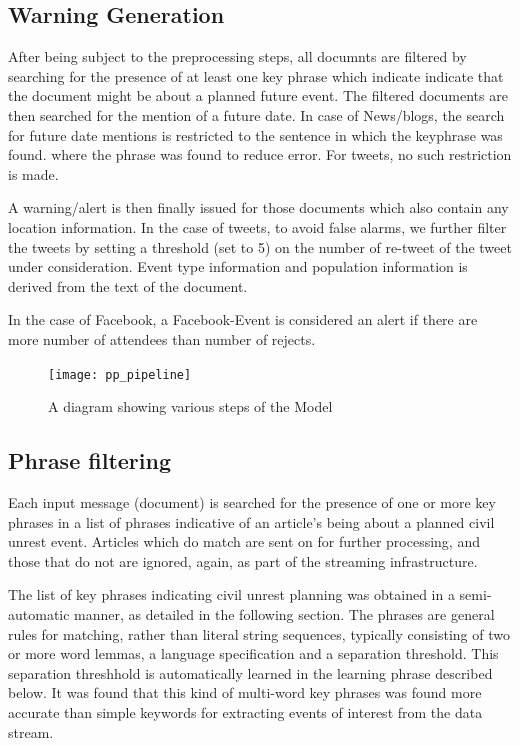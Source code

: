 \subsection{Warning Generation}
After being subject to the preprocessing steps, all documnts are
filtered by searching for the presence of at least one key phrase
which indicate indicate that the document might be about a planned
future event.  The filtered documents are then searched for the
mention of a future date. In case of News/blogs, the search for future
date mentions is restricted to the sentence in which the keyphrase was
found.  where the phrase was found to reduce error. For tweets, no
such restriction is made.

A warning/alert is then finally issued for those documents which also
contain any location information.  In the case of tweets, to avoid
false alarms, we further filter the tweets by setting a threshold (set
to 5) on the number of re-tweet of the tweet under consideration.
Event type information and population information is derived from the
text of the document.

In the case of Facebook, a Facebook-Event is considered an alert if there are more number of attendees than number of rejects.

\begin{figure}
\texttt{[image: pp\_pipeline]}
\caption{A diagram showing various steps of the Model}
\end{figure}

\subsection{Phrase filtering}

Each input message (document) is searched for the presence of one or
more key phrases in a list of phrases indicative of an article's being
about a planned civil unrest event.  Articles which do match are sent on for further processing,
and those that do not are ignored, again, as part of the streaming infrastructure.

The list of key phrases indicating civil unrest planning was obtained
in a semi-automatic manner, as detailed in the following section. The
phrases are general rules for matching, rather than literal string
sequences, typically consisting of two or more word lemmas, a language
specification and a separation threshold. This separation threshhold is automatically learned
in the learning phrase described below.  It was found that this kind of multi-word key phrases was found more accurate than simple
keywords for extracting events of interest from the data stream.


